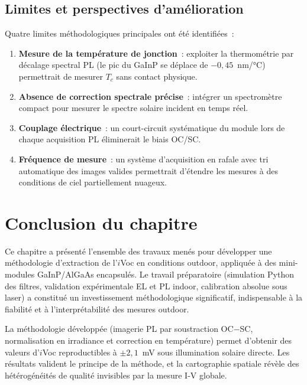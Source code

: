 \documentclass[12pt,a4paper]{report}
\begin{document}
\subsection{Limites et perspectives d'amélioration}

Quatre limites méthodologiques principales ont été identifiées~:

\begin{enumerate}
  \item \textbf{Mesure de la température de jonction}~: exploiter la thermométrie par décalage spectral PL (le pic du GaInP se déplace de $-0{,}45$~nm/°C) permettrait de mesurer $T_c$ sans contact physique.
  \item \textbf{Absence de correction spectrale précise}~: intégrer un spectromètre compact pour mesurer le spectre solaire incident en temps réel.
  \item \textbf{Couplage électrique}~: un court-circuit systématique du module lors de chaque acquisition PL éliminerait le biais OC/SC.
  \item \textbf{Fréquence de mesure}~: un système d'acquisition en rafale avec tri automatique des images valides permettrait d'étendre les mesures à des conditions de ciel partiellement nuageux.
\end{enumerate}

\section*{Conclusion du chapitre}

Ce chapitre a présenté l'ensemble des travaux menés pour développer une méthodologie d'extraction de l'$i$Voc en conditions outdoor, appliquée à des mini-modules GaInP/AlGaAs encapsulés. Le travail préparatoire (simulation Python des filtres, validation expérimentale EL et PL indoor, calibration absolue sous laser) a constitué un investissement méthodologique significatif, indispensable à la fiabilité et à l'interprétabilité des mesures outdoor.

La méthodologie développée (imagerie PL par soustraction OC$-$SC, normalisation en irradiance et correction en température) permet d'obtenir des valeurs d'$i$Voc reproductibles à $\pm 2{,}1$~mV sous illumination solaire directe. Les résultats valident le principe de la méthode, et la cartographie spatiale révèle des hétérogénéités de qualité invisibles par la mesure I-V globale.

\end{document}
